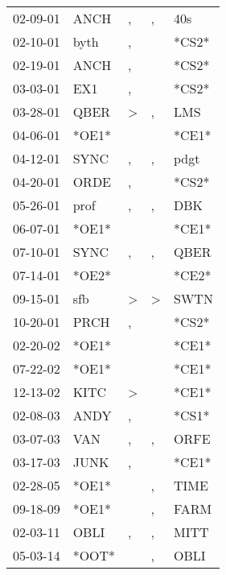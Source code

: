 \begin{supertabular}{lllll}
 02-09-01 &   ANCH &             , &             , &    40s \\
 02-10-01 &   byth &             , &               &  *CS2* \\
 02-19-01 &   ANCH &             , &               &  *CS2* \\
 03-03-01 &    EX1 &             , &               &  *CS2* \\
 03-28-01 &   QBER &  \textgreater &             , &    LMS \\
 04-06-01 &  *OE1* &               &               &  *CE1* \\
 04-12-01 &   SYNC &             , &             , &   pdgt \\
 04-20-01 &   ORDE &             , &               &  *CS2* \\
 05-26-01 &   prof &             , &             , &    DBK \\
 06-07-01 &  *OE1* &               &               &  *CE1* \\
 07-10-01 &   SYNC &             , &             , &   QBER \\
 07-14-01 &  *OE2* &               &               &  *CE2* \\
 09-15-01 &    sfb &  \textgreater &  \textgreater &   SWTN \\
 10-20-01 &   PRCH &             , &               &  *CS2* \\
 02-20-02 &  *OE1* &               &               &  *CE1* \\
 07-22-02 &  *OE1* &               &               &  *CE1* \\
 12-13-02 &   KITC &  \textgreater &               &  *CE1* \\
 02-08-03 &   ANDY &             , &               &  *CS1* \\
 03-07-03 &    VAN &             , &             , &   ORFE \\
 03-17-03 &   JUNK &             , &               &  *CE1* \\
 02-28-05 &  *OE1* &               &             , &   TIME \\
 09-18-09 &  *OE1* &               &             , &   FARM \\
 02-03-11 &   OBLI &             , &             , &   MITT \\
 05-03-14 &  *OOT* &               &             , &   OBLI \\
\end{supertabular}
